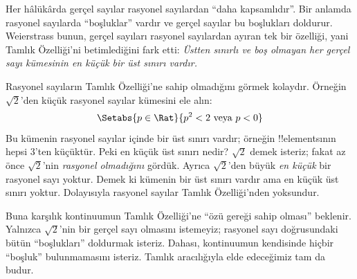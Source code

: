 \documentclass[../../../include/open-logic-section]{subfiles}
\begin{document}
Her hâlükârda gerçel sayılar rasyonel sayılardan “daha kapsamlıdır”. Bir
anlamda rasyonel sayılarda “boşluklar” vardır ve gerçel sayılar bu boşlukları
doldurur. Weierstrass bunun, gerçel sayıları rasyonel sayılardan ayıran tek bir
özelliği, yani Tamlık Özelliği'ni betimlediğini fark etti:
\emph{Üstten sınırlı ve boş olmayan her gerçel sayı kümesinin en küçük bir üst
sınırı vardır.}

Rasyonel sayıların Tamlık Özelliği'ne sahip olmadığını görmek kolaydır.
Örneğin $\sqrt{2}$'den küçük rasyonel sayılar kümesini ele alın:
\[
	\Setabs{p \in \Rat}{p^2 < 2 \text{ veya }p < 0}
\]
Bu kümenin rasyonel sayılar içinde bir üst sınırı vardır; örneğin
!!{element}s{}ının hepsi $3$'ten küçüktür. Peki en küçük üst sınırı nedir?
$\sqrt{2}$ demek isteriz; fakat az önce $\sqrt{2}$'nin \emph{rasyonel
olmadığını} gördük. Ayrıca $\sqrt{2}$'den büyük \emph{en küçük} bir rasyonel
sayı yoktur. Demek ki kümenin bir üst sınırı vardır ama en küçük üst sınırı
yoktur. Dolayısıyla rasyonel sayılar Tamlık Özelliği'nden yoksundur.

Buna karşılık kontinuumun Tamlık Özelliği'ne “özü gereği sahip olması”
beklenir. Yalnızca $\sqrt{2}$'nin bir gerçel sayı olmasını istemeyiz; rasyonel
sayı doğrusundaki bütün “boşlukları” doldurmak isteriz. Dahası, kontinuumun
kendisinde hiçbir “boşluk” bulunmamasını isteriz. Tamlık aracılığıyla elde
edeceğimiz tam da budur.
\end{document}
